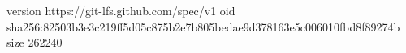 version https://git-lfs.github.com/spec/v1
oid sha256:82503b3e3c219ff5d05c875b2e7b805bedae9d378163e5c006010fbd8f89274b
size 262240
